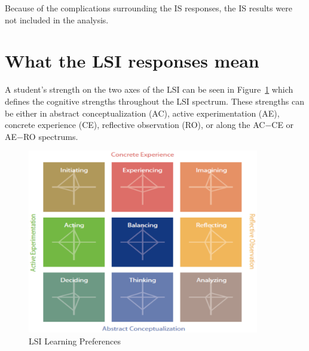Because of the complications surrounding the IS responses, the IS results were not included in the analysis.

\section{What the LSI responses mean}
A student's strength on the two axes of the LSI can be seen in Figure~\ref{fig:learning-preferences} which defines the cognitive strengths throughout the LSI spectrum. These strengths can be either in abstract conceptualization (AC), active experimentation (AE), concrete experience (CE), reflective observation (RO), or along the AC$-$CE or AE$-$RO spectrums.

\begin{figure}
  \centering
  \includegraphics[width=0.9\textwidth]{figures/chapter4/learning-preferences.png}
  \caption{LSI Learning Preferences}
  \label{fig:learning-preferences}
\end{figure}

